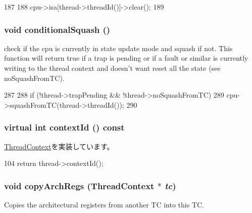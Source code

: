 \begin{DoxyCode}
187 {
188     cpu->isa[thread->threadId()]->clear();
189 }
\end{DoxyCode}
\hypertarget{classO3ThreadContext_a08e5264ebc09ba108b6147ed5060ad92}{
\subsubsection[{conditionalSquash}]{\setlength{\rightskip}{0pt plus 5cm}void conditionalSquash ()}}
\label{classO3ThreadContext_a08e5264ebc09ba108b6147ed5060ad92}
check if the cpu is currently in state update mode and squash if not. This function will return true if a trap is pending or if a fault or similar is currently writing to the thread context and doesn't want reset all the state (see noSquashFromTC). 


\begin{DoxyCode}
287     {
288         if (!thread->trapPending && !thread->noSquashFromTC)
289             cpu->squashFromTC(thread->threadId());
290     }
\end{DoxyCode}
\hypertarget{classO3ThreadContext_a6112c7e72d0367debf95bc85bd28b31a}{
\subsubsection[{contextId}]{\setlength{\rightskip}{0pt plus 5cm}virtual int contextId () const}}
\label{classO3ThreadContext_a6112c7e72d0367debf95bc85bd28b31a}


\hyperlink{classThreadContext_a5a3ce3f955d2ec16ac6f2aa21e42f3a0}{ThreadContext}を実装しています。


\begin{DoxyCode}
104 { return thread->contextId(); }
\end{DoxyCode}
\hypertarget{classO3ThreadContext_a01b372f805c92c90e6148b76d23d6236}{
\subsubsection[{copyArchRegs}]{\setlength{\rightskip}{0pt plus 5cm}void copyArchRegs ({\bf ThreadContext} $\ast$ {\em tc})}}
\label{classO3ThreadContext_a01b372f805c92c90e6148b76d23d6236}
Copies the architectural registers from another TC into this TC. 


